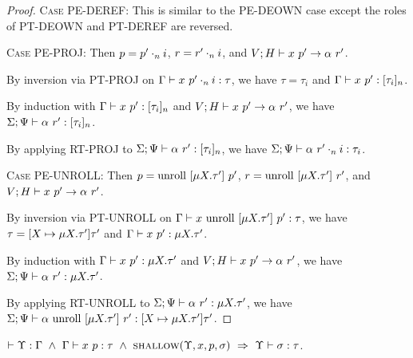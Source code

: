 \documentclass{article}
\begin{document}
\begin{proof}
    \textsc{Case PE-DEREF}: 
      This is similar to the \textsc{PE-DEOWN} case except the roles of
      \textsc{PT-DEOWN} and \textsc{PT-DEREF} are reversed.

  \textsc{Case PE-PROJ}:
    Then $p = {p'}\cdot_{n} {i}$, $r = {r'}\cdot_{n} {i}$, and ${{V};{H}} \vdash {{x}\ {p'}} \rightarrow {{\alpha}\ {r'}}$.

    By inversion via \textsc{PT-PROJ} on ${{\Gamma}} \vdash {{x}\ {{p'}\cdot_{n} {i}}} : {{\tau}}$,
    we have $\tau = \tau_i$ and ${{\Gamma}} \vdash {{x}\ {p'}} : {{[ {\tau_i} ]_{n}}}$.

    By induction with ${{\Gamma}} \vdash {{x}\ {p'}} : {{[ {\tau_i} ]_{n}}}$
    and ${{V};{H}} \vdash {{x}\ {p'}} \rightarrow {{\alpha}\ {r'}}$,
    we have ${{{\Sigma}} ;{{\Psi}}} \vdash {{{\alpha}\ {r'}}} : {{{[ {\tau_i} ]_{n}}}}$.

    By applying \textsc{RT-PROJ} to ${{{\Sigma}} ;{{\Psi}}} \vdash {{{\alpha}\ {r'}}} : {{{[ {\tau_i} ]_{n}}}}$,
    we have ${{{\Sigma}} ;{{\Psi}}} \vdash {{{\alpha}\ {{r'}\cdot_{n} {i}}}} : {{{\tau_i}}}$.

  \textsc{Case PE-UNROLL}:
    Then $p = \textrm{unroll}\ [{\mu {X}.{\tau'}}]\ {p'}$, $r = \textrm{unroll}\ [{\mu {X}.{\tau'}}]\ {r'}$,
    and ${{V};{H}} \vdash {{x}\ {p'}} \rightarrow {{\alpha}\ {r'}}$.

    By inversion via \textsc{PT-UNROLL} on ${{\Gamma}} \vdash {{x}\ {\textrm{unroll}\ [{\mu {X}.{\tau'}}]\ {p'}}} : {{\tau}}$,
    we have $\tau = [{X} \mapsto {\mu {X}.{\tau'}}]{\tau'}$ and ${{\Gamma}} \vdash {{x}\ {p'}} : {{\mu {X}.{\tau'}}}$.

    By induction with ${{\Gamma}} \vdash {{x}\ {p'}} : {{\mu {X}.{\tau'}}}$ and ${{V};{H}} \vdash {{x}\ {p'}} \rightarrow {{\alpha}\ {r'}}$,
    we have ${{{\Sigma}} ;{{\Psi}}} \vdash {{{\alpha}\ {r'}}} : {{{\mu {X}.{\tau'}}}}$.

    By applying \textsc{RT-UNROLL} to ${{{\Sigma}} ;{{\Psi}}} \vdash {{{\alpha}\ {r'}}} : {{{\mu {X}.{\tau'}}}}$,
    we have
    ${{{\Sigma}} ;{{\Psi}}} \vdash {{{\alpha}\ {\textrm{unroll}\ [{\mu {X}.{\tau'}}]\ {r'}}}} : {{{[{X} \mapsto {\mu {X}.{\tau'}}]{\tau'}}}}$.
\end{proof}

\begin{lem}
  $\YWF{\Upsilon}{\Gamma}\ \land\ \PType{\Gamma}{x}{p}{\tau}\ \land\
   \Shallow{\Upsilon}{x}{p}{\sigma}\ \Rightarrow\ \Type{\Upsilon}{\sigma}{\tau}$.
\end{lem}
\end{document}
